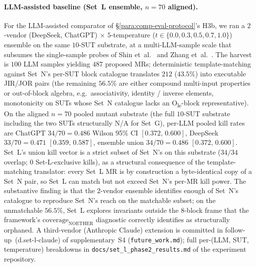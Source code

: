 \documentclass[manuscript]{acmart}
\begin{document}
\paragraph{LLM-assisted baseline (Set~L ensemble, $n = 70$ aligned).}
\label{para:set-l-ensemble}
For the LLM-assisted comparator of \S\ref{para:comp-eval-protocol}'s
H3b, we ran a $2$-vendor (DeepSeek, ChatGPT) $\times$ $5$-temperature
($t \in \{0.0, 0.3, 0.5, 0.7, 1.0\}$) ensemble on the same
$10$-SUT substrate, at a multi-LLM-sample scale that subsumes the
single-sample probes of Shin et~al.~\cite{Shin2024} and
Zhang et~al.~\cite{ZhangChatGPTMR2023}. The harvest is $100$ LLM samples
yielding $487$ proposed MRs; deterministic template-matching against
Set~N's per-SUT block catalogue translates $212$ ($43.5\%$) into
executable JIR/JOR pairs (the remaining $56.5\%$ are either compound
multi-input properties or out-of-block algebra, e.g.\ associativity,
identity / inverse elements, monotonicity on SUTs whose Set~N
catalogue lacks an O\textsubscript{le}-block representative). On the
aligned $n = 70$ pooled mutant substrate (the full $10$-SUT
substrate including the two SUTs structurally N/A for Set~G), per-LLM
pooled kill rates are ChatGPT $34/70 = 0.486$ Wilson 95\% CI
$[0.372,\,0.600]$, DeepSeek $33/70 = 0.471$ $[0.359,\,0.587]$,
ensemble union $34/70 = 0.486$ $[0.372,\,0.600]$. Set~L's union kill
vector is a strict subset of Set~N's on this substrate ($34/34$
overlap; $0$ Set-L-exclusive kills), as a structural consequence of
the template-matching translator: every Set~L MR is by construction
a byte-identical copy of a Set~N pair, so Set~L can match but not
exceed Set~N's per-MR kill power. The substantive finding is that
the $2$-vendor ensemble identifies enough of Set~N's catalogue to
reproduce Set~N's reach on the matchable subset; on the unmatchable
$56.5\%$, Set~L explores invariants outside the $8$-block frame that
the framework's $\mathrm{coverage}_{\mathrm{NOETHER}}$ diagnostic
correctly identifies as structurally orphaned. A third-vendor
(Anthropic Claude) extension is committed in
follow-up~(d.set-l-claude) of supplementary~S4 (\texttt{future\_work.md}); full
per-(LLM, SUT, temperature) breakdowns in
\texttt{docs/set\_l\_phase2\_results.md} of the experiment
repository.
\end{document}
